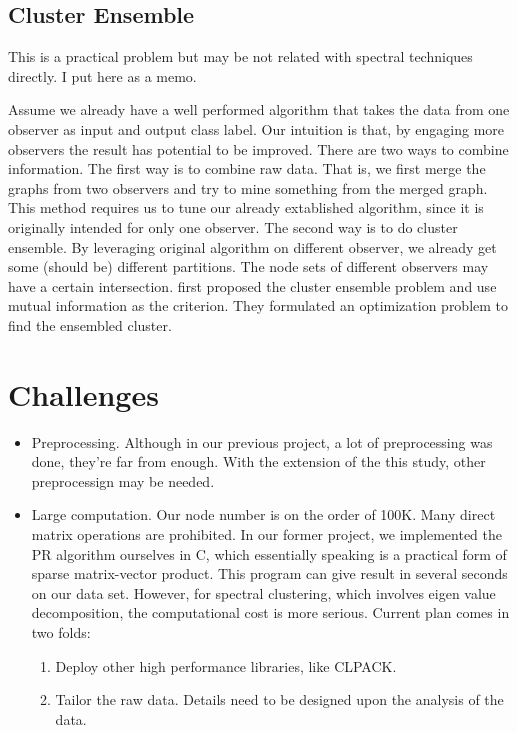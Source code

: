 \documentclass[11pt,a4paper]{article}
\begin{document}
\subsection{Cluster Ensemble}

This is a practical problem but may be not related with spectral techniques directly. 
I put here as a memo. 

Assume we already have a well performed algorithm that takes the data from 
one observer as input and output class label. Our intuition is that, 
by engaging more observers the result has potential to be improved. 
There are two ways to combine information. The first way is to combine raw data. 
That is, we first merge the graphs from two observers and try to 
mine something from the merged graph. This method requires us to 
tune our already extablished algorithm, since it is originally intended 
for only one observer. The second way is to do cluster ensemble. 
By leveraging original algorithm on different observer, we already 
get some (should be) different partitions. The node sets of different 
observers may have a certain intersection. \cite{strehl2003cluster} 
first proposed the cluster ensemble problem and use mutual information 
as the criterion. They formulated an optimization problem to find
the ensembled cluster. 

\section{Challenges}

\begin{itemize}
	\item Preprocessing. Although in our previous project, 
	a lot of preprocessing was done, they're far from enough. 
	With the extension of the this study, other preprocessign may be needed. 
	\item Large computation. Our node number is on the order 
	of 100K. Many direct matrix operations are prohibited.
	In our former project, we implemented the PR algorithm ourselves 
	in C, which essentially speaking is a practical form of 
	sparse matrix-vector product. This program can give result 
	in several seconds on our data set. However, for spectral 
	clustering, which involves eigen value decomposition, 
	the computational cost is more serious. Current plan comes 
	in two folds:
		\begin{enumerate}
			\item Deploy other high performance libraries, like 
			CLPACK. 
			\item Tailor the raw data. Details need to be designed 
			upon the analysis of the data. 
		\end{enumerate}		  
\end{itemize}
\end{document}

